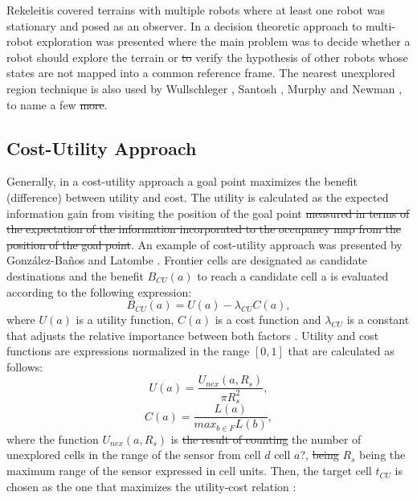 Rekeleitis \cite{Rekeleitis2000} covered terrains with multiple robots where at least one robot was stationary and posed as an observer. In \cite{Fox2006} a decision theoretic approach to multi-robot exploration was presented where the main problem was to decide whether a robot should explore the terrain or \st{to} verify the hypothesis of other robots whose states are not mapped into a common reference frame. The nearest unexplored region technique is also used by Wullschleger \cite{Wullschleger99}, Santosh \cite{Santosh2008}, Murphy and Newman \cite{Murphy2008}, to name a few \st{more}.

\subsection{Cost-Utility Approach}
Generally, in a cost-utility approach a goal point maximizes the benefit {\color{red}(difference)} between utility and cost. The utility is {\color{red}calculated as the expected information gain from visiting the position of the goal point} \st{measured in terms of the expectation of the information incorporated to the occupancy map from the position of the goal point}. An example of cost-utility approach was presented by González-Baños and Latombe \cite{GonzlezBaos2002}. Frontier cells are designated as candidate destinations and the benefit $B_{CU}(a)$ to reach a candidate cell a is evaluated according to the following expression:
\begin{equation}
B_{CU}(a) = U(a) - \lambda_{CU}C(a),
\label{equation:cost-utility}
\end{equation}
where $U(a)$ is a utility function, $C(a)$ is a cost function and $\lambda_{CU}$ is a constant that adjusts the relative importance between both factors \cite{Julia2012}. Utility and cost functions are expressions normalized in the range $\left[0, 1\right]$ that are calculated as follows:
\begin{equation}
U(a) = \frac{U_{nex}(a, R_{s})}{\pi R_{s}^{2}},
\end{equation}
\begin{equation}
C(a) = \frac{L(a)}{max_{b \in F}L(b)},
\end{equation}
where the function $U_{nex}(a, R_{s})$ is \st{the result of counting} the number of unexplored cells in the range of the sensor from cell $d$ {\color{green}cell $a$?}, \st{being} $R_{s}$ {\color{red}being} the maximum range of the sensor expressed in cell units.
Then, the target cell $t_{CU}$ is chosen as the one that maximizes the utility-cost relation \cite{Julia2012}:
